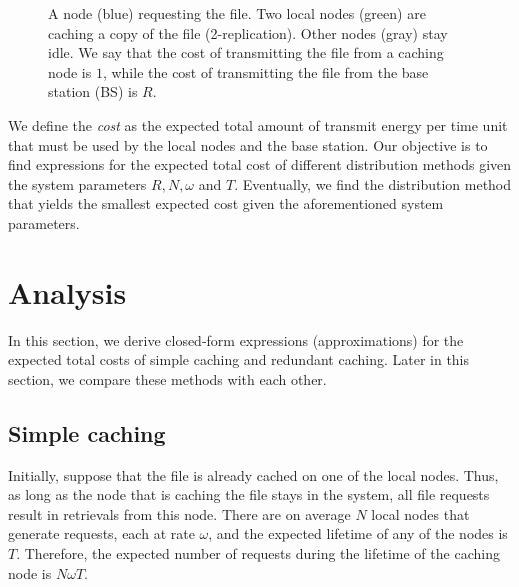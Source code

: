 \documentclass[10pt,conference]{IEEEtran}
\begin{document}
\begin{figure}[htb]
\caption{A node (blue) requesting the file. Two local nodes (green) are caching a copy of the file (2-replication). Other nodes (gray) stay idle. We say that the cost of transmitting the file from a caching node is $1$, while the cost of transmitting the file from the base station (BS) is $R$.}
\label{BS}
\end{figure}
We define the \emph{cost} as the expected total amount of transmit energy per time unit that must be used by the local nodes and the base station. Our objective is to find expressions for the expected total cost of different distribution methods given the system parameters $R, N, \omega$ and $T$. Eventually, we find the distribution method that yields the smallest expected cost given the aforementioned system parameters.

\section{Analysis}\label{analysissec}

In this section, we derive closed-form expressions (approximations)
for the expected total costs of simple caching and redundant caching.
Later in this section, we compare these methods with each other.

\subsection{Simple caching}

Initially, suppose that the file is already cached on one of the local
nodes. Thus, as long as the node that is caching the file stays in the
system, all file requests result in retrievals from this node. There
are on average $N$ local nodes that generate requests, each at rate
$\omega$, and the expected lifetime of any of the nodes is $T$.
Therefore, the expected number of requests during the lifetime of the
caching node is $N\omega T$.
\end{document}
